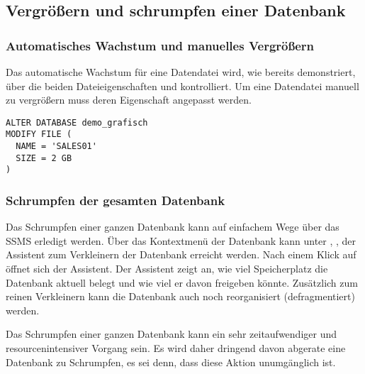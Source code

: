       \subsection{Vergrößern und schrumpfen einer Datenbank}
        \subsubsection{Automatisches Wachstum und manuelles Vergrößern}
          Das automatische Wachstum für eine Datendatei wird, wie bereits
          demonstriert, über die beiden Dateieigenschaften
           und  kontrolliert. Um eine
          Datendatei manuell zu vergrößern muss deren Eigenschaft
           angepasst werden.
          \begin{lstlisting}[language=ms_sql,caption={Eine
          Datendatei vergrößern},label=admin03_19]
ALTER DATABASE demo_grafisch
MODIFY FILE (
  NAME = 'SALES01'
  SIZE = 2 GB
)
          \end{lstlisting}
        \subsubsection{Schrumpfen der gesamten Datenbank}
          Das Schrumpfen einer ganzen Datenbank kann auf einfachem Wege über das
          SSMS erledigt werden. Über das Kontextmenü der Datenbank kann unter
          , , 
          der Assistent zum Verkleinern der Datenbank erreicht werden.
          Nach einem Klick auf  öffnet sich der Assistent.
          Der Assistent zeigt an, wie viel Speicherplatz die Datenbank aktuell
          belegt und wie viel er davon freigeben könnte. Zusätzlich zum reinen
          Verkleinern kann die Datenbank auch noch reorganisiert
          (defragmentiert) werden.
          \begin{merke}
            Das Schrumpfen einer ganzen Datenbank kann ein sehr zeitaufwendiger
            und resourcenintensiver Vorgang sein. Es wird daher dringend davon
            abgerate eine Datenbank zu Schrumpfen, es sei denn, dass diese
            Aktion unumgänglich ist.
          \end{merke}
